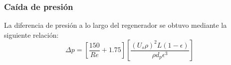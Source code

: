 \documentclass[12pt,letterpaper,final]{article}%
\begin{document}
\subsubsection{Caída de presión}
La diferencia de presión a lo largo del regenerador se obtuvo mediante la siguiente relación\cite{Valle-Guadarrama2015}:
\begin{equation}\label{Ecu_ergun}
	\Delta p = [ \frac{150}{Re} + 1.75 ] [ \frac{(U_s \rho)^2 L (1-\epsilon)}{\rho d_p \epsilon^3}  ]
\end{equation}
\newpage
\printbibliography
\end{document}
